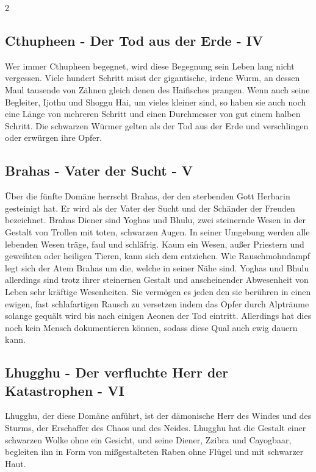 \begin{multicols}{2}
{\subsection{Cthupheen - Der Tod aus der Erde - IV}\label{subsec:cthupheen-der-tod-aus-der-erde}

Wer immer Cthupheen begegnet, wird diese Begegnung sein Leben lang nicht vergessen.
Viele hundert Schritt misst der gigantische, irdene Wurm, an dessen Maul tausende von Zähnen gleich denen des Haifisches prangen.
Wenn auch seine Begleiter, Ijothu und Shoggu Hai, um vieles kleiner sind, so haben sie auch noch eine Länge von mehreren Schritt und einen Durchmesser von gut einem halben Schritt.
Die schwarzen Würmer gelten als der Tod aus der Erde und verschlingen oder erwürgen ihre Opfer.

\subsection{Brahas - Vater der Sucht - V}\label{subsec:brahas-vater-der-sucht}

Über die fünfte Domäne herrscht Brahas, der den sterbenden Gott Herbarin gesteinigt hat.
Er wird als der Vater der Sucht und der Schänder der Freuden bezeichnet.
Brahas Diener sind Yoghas und Bhulu, zwei steinernde Wesen in der Gestalt von Trollen mit toten, schwarzen Augen.
In seiner Umgebung werden alle lebenden Wesen träge, faul und schläfrig.
Kaum ein Wesen, außer Priestern und geweihten oder heiligen Tieren, kann sich dem entziehen.
Wie Rauschmohndampf legt sich der Atem Brahas um die, welche in seiner Nähe sind.
Yoghas und Bhulu allerdings sind trotz ihrer steinernen Gestalt und anscheinender Abwesenheit von Leben sehr kräftige Wesenheiten.
Sie vermögen es jeden den sie berühren in einen ewigen, fast schlafartigen Rausch zu versetzen indem das Opfer durch Alpträume solange gequält wird bis nach einigen Aeonen der Tod eintritt.
Allerdings hat dies noch kein Mensch dokumentieren können, sodass diese Qual auch ewig dauern kann.

\subsection{Lhugghu - Der verfluchte Herr der Katastrophen - VI}\label{subsec:lhugghu-der-verfluchte-herr-der-katastrophen}

Lhugghu, der diese Domäne anführt, ist der dämonische Herr des Windes und des Sturms, der Erschaffer des Chaos und des Neides.
Lhugghu hat die Gestalt einer schwarzen Wolke ohne ein Gesicht, und seine Diener, Zzibra und Cayogbaar, begleiten ihn in Form von mißgestalteten Raben ohne Flügel und mit schwarzer Haut.

}
\end{multicols}
